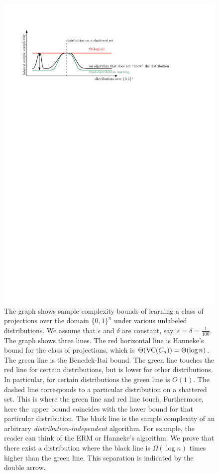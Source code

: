 \begin{figure}
\centering
\includegraphics[scale=0.55]{figure}
\caption{\small The graph shows sample complexity bounds of learning a class of
projections over the domain $\{0,1\}^n$ under various unlabeled distributions.
We assume that $\epsilon$ and $\delta$ are constant, say, $\epsilon = \delta =
\frac{1}{100}$. The graph shows three lines. The red horizontal line is
Hanneke's bound for the class of projections, which is $\Theta(\operatorname{VC}(C_n)) =
\Theta(\log n)$. The green line is the Benedek-Itai bound. The green line
touches the red line for certain distributions, but is lower for other
distributions. In particular, for certain distributions the green line is
$O(1)$. The dashed line corresponds to a particular distribution on a shattered
set. This is where the green line and red line touch. Furthermore, here the
upper bound coincides with the lower bound for that particular distribution. The
black line is the sample complexity of an arbitrary
\emph{distribution-independent} algorithm. For example, the reader can think of
the ERM or Hanneke's algorithm. We prove that there exist a distribution where
the black line is $\Omega(\log n)$ times higher than the green line. This
separation is indicated by the double arrow.}
\label{figure:sample-complexity}
\end{figure}

